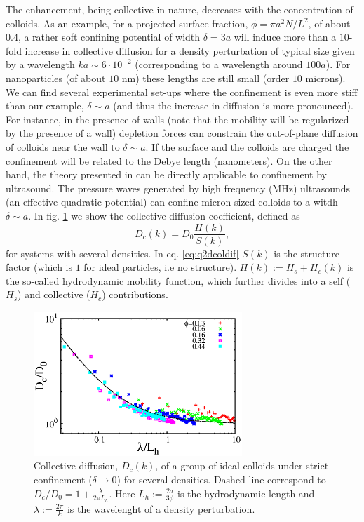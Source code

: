 \documentclass[ twoside,openright,titlepage,numbers=noenddot,%
headinclude,footinclude,cleardoublepage=empty,abstract=on,
BCOR=5mm,paper=a4,fontsize=11pt, dvipsnames
]{scrreprt}
\begin{document}
  The enhancement, being collective in nature, decreases with the concentration of colloids. As an example, for a projected surface fraction, $\phi = \pi a^2N/L^2$, of about $0.4$, a rather soft confining potential of width $\delta = 3a$ will induce more than a $10$-fold increase in collective diffusion for a density perturbation of typical size given by a wavelength $ka \sim 6\cdot 10^{-2}$ (corresponding to a wavelength around $100a$). For nanoparticles (of about $10$ nm) these lengths are still small (order $10$ microns). We can find several experimental set-ups where the confinement is even more stiff than our example, $\delta\sim a$ (and thus the increase in diffusion is more pronounced). For instance, in the presence of walls (note that the mobility will be regularized by the presence of a wall) depletion forces can constrain the out-of-plane diffusion of colloids near the wall to $\delta\sim a$. If the surface and the colloids are charged the confinement will be related to the Debye length (nanometers). On the other hand, the theory presented in \cite{Pelaez2017} can be directly applicable to confinement by ultrasound. The pressure waves generated by high frequency (MHz) ultrasounds (an effective quadratic potential) can confine micron-sized colloids to a witdh $\delta \sim a$.
  In fig. \ref{fig:q2DEnhancement} we show the collective diffusion coefficient, defined as
  \begin{equation}
    \label{eq:q2dcoldif}
    D_c(k) = D_0\frac{H(k)}{S(k)},
  \end{equation}
  for systems with several densities.
  In eq. \eqref{eq:q2dcoldif} $S(k)$ is the structure factor (which is $1$ for ideal particles, i.e no structure). $H(k):= H_s + H_c(k)$ is the so-called hydrodynamic mobility function, which further divides into a self ($H_s$) and collective ($H_c$) contributions.
  \begin{figure}[H]
    \label{fig:q2DEnhancement}
    \centering
    \includegraphics[width=0.7\textwidth]{gfx/q2DEnhancement}
    \caption{Collective diffusion, $D_c(k)$, of a group of ideal colloids under strict confinement ($\delta\rightarrow 0$) for several densities. Dashed line correspond to $D_c/D_0 = 1 + \frac{\lambda}{2\pi L_h}$. Here $L_h := \frac{2a}{3\phi}$ is the hydrodynamic length and $\lambda := \frac{2\pi}{k}$ is the wavelenght of a density perturbation.}
  \end{figure}
  
\end{document}
